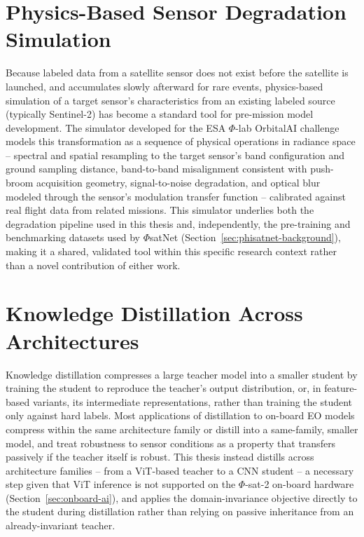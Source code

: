 \section{Physics-Based Sensor Degradation Simulation}

Because labeled data from a satellite sensor does not exist before the satellite is launched, and accumulates slowly afterward for rare events, physics-based simulation of a target sensor's characteristics from an existing labeled source (typically Sentinel-2) has become a standard tool for pre-mission model development.
The simulator developed for the ESA $\Phi$-lab OrbitalAI challenge \cite{longepe2024orbitalai} models this transformation as a sequence of physical operations in radiance space -- spectral and spatial resampling to the target sensor's band configuration and ground sampling distance, band-to-band misalignment consistent with push-broom acquisition geometry, signal-to-noise degradation, and optical blur modeled through the sensor's modulation transfer function -- calibrated against real flight data from related missions.
This simulator underlies both the degradation pipeline used in this thesis and, independently, the pre-training and benchmarking datasets used by $\Phi$satNet (Section~\ref{sec:phisatnet-background}), making it a shared, validated tool within this specific research context rather than a novel contribution of either work.

\section{Knowledge Distillation Across Architectures}

Knowledge distillation \cite{hinton2015distilling} compresses a large teacher model into a smaller student by training the student to reproduce the teacher's output distribution, or, in feature-based variants, its intermediate representations, rather than training the student only against hard labels.
Most applications of distillation to on-board EO models compress within the same architecture family or distill into a same-family, smaller model, and treat robustness to sensor conditions as a property that transfers passively if the teacher itself is robust.
This thesis instead distills across architecture families -- from a ViT-based teacher to a CNN student -- a necessary step given that ViT inference is not supported on the $\Phi$-sat-2 on-board hardware (Section~\ref{sec:onboard-ai}), and applies the domain-invariance objective directly to the student during distillation rather than relying on passive inheritance from an already-invariant teacher.


